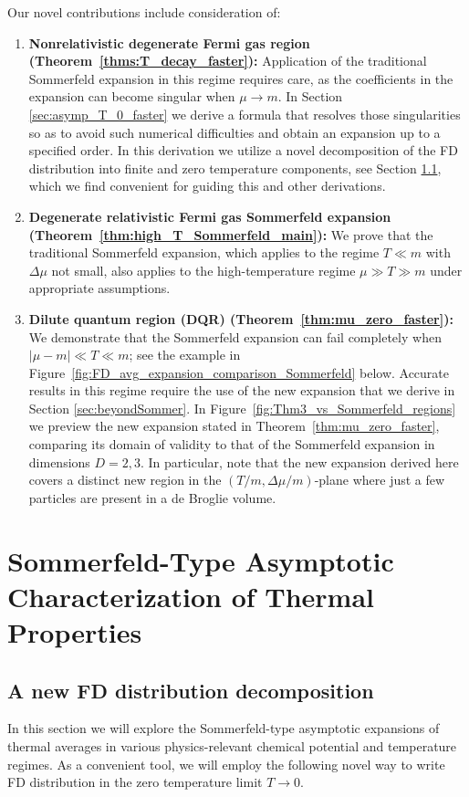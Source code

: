 \documentclass[sn-mathphys,Numbered]{sn-jnl}
\newcommand{\rf}[1]{Figure~{\ref{#1}}}
\newcommand{\rTh}[1]{Theorem~{\ref{#1}}}
\begin{document}
Our novel contributions include consideration of:
\begin{enumerate}
\item {\bf Nonrelativistic degenerate Fermi gas region (\rTh{thms:T_decay_faster}):} Application of the traditional Sommerfeld expansion in this regime requires care, as the coefficients in the expansion can become singular when $\mu\to m$. In Section \ref{sec:asymp_T_0_faster} we derive a formula that resolves those singularities so as to avoid such numerical difficulties and obtain an expansion up to a specified order.  In this derivation we utilize a novel decomposition of the FD distribution into finite and zero temperature components, see Section \ref{FermiDvisit}, which we find convenient for guiding this and other derivations.
\item {\bf Degenerate relativistic Fermi gas Sommerfeld expansion (\rTh{thm:high_T_Sommerfeld_main}):} We prove that the traditional Sommerfeld expansion, which applies to the regime $T\ll m$ with $\Delta\mu$ not small, also applies to the high-temperature regime $\mu\gg T\gg m$ under appropriate assumptions.
\item {\bf Dilute quantum region (DQR) (\rTh{thm:mu_zero_faster}):} We demonstrate that the Sommerfeld expansion can fail completely when $|\mu-m|\ll T\ll m$; see the example in \rf{fig:FD_avg_expansion_comparison_Sommerfeld} below. Accurate results in this regime require the use of the new expansion that we derive in Section \ref{sec:beyondSommer}. In \rf{fig:Thm3_vs_Sommerfeld_regions} we preview the new expansion stated in \rTh{thm:mu_zero_faster}, comparing its domain of validity to that of the Sommerfeld expansion in dimensions $D=2,3$. In particular, note that the new expansion derived here covers a distinct new region in the $(T/m,\Delta\mu/m)$-plane where just a few particles are present in a de Broglie volume.
\end{enumerate}

 
\section{Sommerfeld-Type Asymptotic Characterization of Thermal Properties}\label{sec:Sommerfeld} 
\subsection{A new FD distribution decomposition}\label{FermiDvisit}%
In this section we will explore the Sommerfeld-type asymptotic expansions of thermal averages in various physics-relevant chemical potential and temperature regimes. As a convenient tool, we will employ the following novel way to write FD distribution in the zero temperature limit $T\to0$. 
\end{document}
